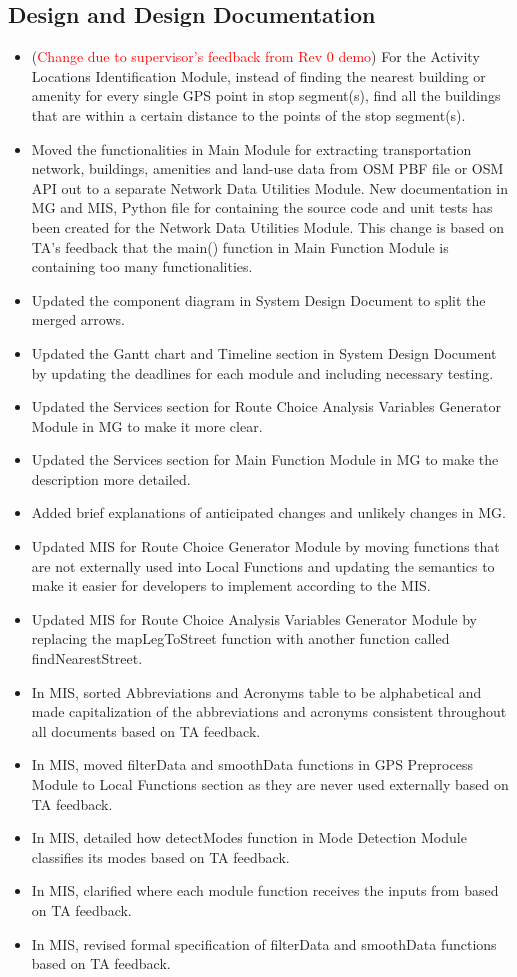 \documentclass{article}
\begin{document}
\subsection{Design and Design Documentation}
\begin{itemize}
    \item (\textcolor{red}{Change due to supervisor's feedback from Rev 0 demo}) For the Activity Locations Identification Module, instead of finding the nearest building or amenity for every single GPS point in stop segment(s), find all the buildings that are within a certain distance to the points of the stop segment(s).
    \item Moved the functionalities in Main Module for extracting transportation network, buildings, amenities and land-use data from OSM PBF file or OSM API out to a separate Network Data Utilities Module. New documentation in MG and MIS, Python file for containing the source code and unit tests has been created for the Network Data Utilities Module. This change is based on TA's feedback that the main() function in Main Function Module is containing too many functionalities.
    \item Updated the component diagram in System Design Document to split the merged arrows.
    \item Updated the Gantt chart and Timeline section in System Design Document by updating the deadlines for each module and including necessary testing.
    \item Updated the Services section for Route Choice Analysis Variables Generator Module in MG to make it more clear.
    \item Updated the Services section for Main Function Module in MG to make the description more detailed.
    \item Added brief explanations of anticipated changes and unlikely changes in MG.
    \item Updated MIS for Route Choice Generator Module by moving functions that are not externally used into Local Functions and updating the semantics to make it easier for developers to implement according to the MIS.
    \item Updated MIS for Route Choice Analysis Variables Generator Module by replacing the mapLegToStreet function with another function called findNearestStreet.
    \item In MIS, sorted Abbreviations and Acronyms table to be alphabetical and made capitalization of the abbreviations and acronyms consistent throughout all documents based on TA feedback.
    \item In MIS, moved filterData and smoothData functions in GPS Preprocess Module to Local Functions section as they are never used externally based on TA feedback.
    \item In MIS, detailed how detectModes function in Mode Detection Module classifies its modes based on TA feedback.
    \item In MIS, clarified where each module function receives the inputs from based on TA feedback.
    \item In MIS, revised formal specification of filterData and smoothData functions based on TA feedback.
    

\end{itemize}
\end{document}
